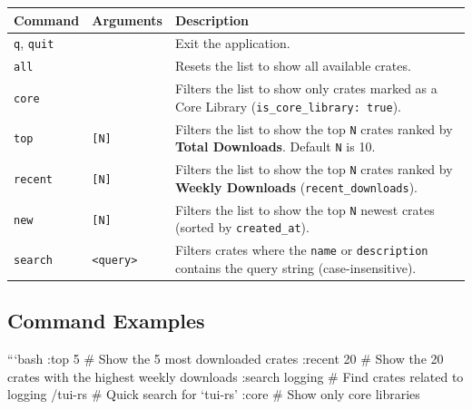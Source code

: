 \documentclass[
  letterpaper,
  DIV=11,
  numbers=noendperiod]{scrreprt}
\begin{document}
\begin{longtable}[]{@{}
  >{\raggedright\arraybackslash}p{}
  >{\raggedright\arraybackslash}p{}
  >{\raggedright\arraybackslash}p{}@{}}
\toprule\noalign{}
\begin{minipage}[b]{\linewidth}\raggedright
Command
\end{minipage} & \begin{minipage}[b]{\linewidth}\raggedright
Arguments
\end{minipage} & \begin{minipage}[b]{\linewidth}\raggedright
Description
\end{minipage} \\
\midrule\noalign{}
\endhead
\bottomrule\noalign{}
\endlastfoot
\texttt{q}, \texttt{quit} & & Exit the application. \\
\texttt{all} & & Resets the list to show all available crates. \\
\texttt{core} & & Filters the list to show only crates marked as a Core
Library (\texttt{is\_core\_library:\ true}). \\
\texttt{top} & \texttt{{[}N{]}} & Filters the list to show the top
\texttt{N} crates ranked by \textbf{Total Downloads}. Default \texttt{N}
is 10. \\
\texttt{recent} & \texttt{{[}N{]}} & Filters the list to show the top
\texttt{N} crates ranked by \textbf{Weekly Downloads}
(\texttt{recent\_downloads}). \\
\texttt{new} & \texttt{{[}N{]}} & Filters the list to show the top
\texttt{N} newest crates (sorted by \texttt{created\_at}). \\
\texttt{search} & \texttt{\textless{}query\textgreater{}} & Filters
crates where the \texttt{name} or \texttt{description} contains the
query string (case-insensitive). \\
\end{longtable}

\subsection{Command Examples}\label{command-examples}

```bash :top 5 \# Show the 5 most downloaded crates :recent 20 \# Show
the 20 crates with the highest weekly downloads :search logging \# Find
crates related to logging /tui-rs \# Quick search for `tui-rs' :core \#
Show only core libraries
\end{document}
